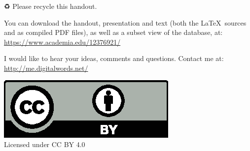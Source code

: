 \vfill


\begin{center}
\begin{extra}
	{♻} Please recycle this handout.
	
	You can download the handout, presentation and text (both the \LaTeX\ sources and as compiled PDF files), as well as a subset view of the database, at:\\
	\url{https://www.academia.edu/12376921/}

	I would like to hear your ideas, comments and questions. Contact me at:\\
	\url{http://me.digitalwords.net/}

	\includegraphics[width=0.20\linewidth]{../cc-by.eps}\\
	Licensed under CC BY 4.0
\end{extra}
\end{center}

